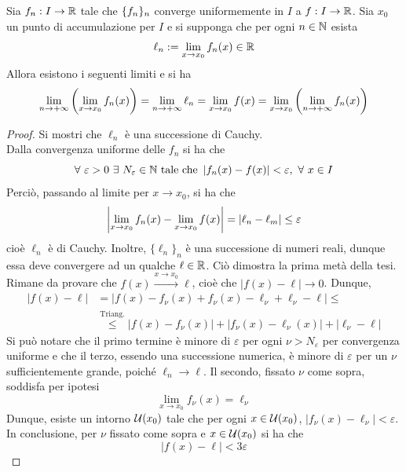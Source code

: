 \begin{theorem} \label{Teo: Scambio di limiti}
Sia $f_n: I \to \mathbb{R}$ tale che $\{f_n\}_n$ converge uniformemente in $I$ a $f: I \to \mathbb{R}$. Sia $x_0$ un punto di accumulazione per $I$ e si supponga che per ogni $n \in \mathbb{N}$ esista
\begin{equation}
    \ell_n:= \lim_{x \to x_0}{f_n(x)} \in \mathbb{R}
\end{equation}
Allora esistono i seguenti limiti e si ha
\begin{equation}
    \lim_{n \to +\infty}{\left(\lim_{x \to x_0} {f_n(x)}\right)}= \lim_{n \to +\infty}{\ell_n} = \lim_{x \to x_0} {f(x)} = \lim_{x \to x_0}{ \left( \lim_{n \to +\infty} {f_n(x)}\right)}
\end{equation}
\end{theorem}
\begin{proof}
    Si mostri che $\ell_n$ è una successione di Cauchy.\\
    Dalla convergenza uniforme delle $f_n$ si ha che
    \begin{equation}
        \forall\ \varepsilon>0\ \exists\ N_\varepsilon \in \N\ \text{tale che}\ \left| \fn(x)-f(x)\right|< \varepsilon,\ \forall\ x \in I
    \end{equation}
    Perciò, passando al limite per $x \to x_0$, si ha che
    \begin{equation}
        \left| \lim_{x \to x_0}{f_n(x)}-\lim_{x \to x_0}{f(x)}\right| = \left| \ell_n - \ell_m \right| \leq \varepsilon
    \end{equation}
    cioè $\ell_n$ è di Cauchy. Inoltre, $\{\ell_n\}_n$ è una successione di numeri reali, dunque essa deve convergere ad un qualche $\ell \in \mathbb{R}$. Ciò dimostra la prima metà della tesi.\\
    Rimane da provare che $f(x) \overset{x \to x_0}{\to} \ell$, cioè che $|f(x)-\ell| \to 0$. Dunque,
    \begin{equation}
    \begin{aligned}
        \left|f(x)-\ell\right| &= \left| f(x) - f_\nu(x)+ f_\nu(x)- \ell_\nu+ \ell_\nu- \ell\right| \leq\\
        &\overset{\text{Triang.}}{\leq} \left| f(x) - f_\nu(x) \right| +\left| f_\nu(x)- \ell_\nu(x)\right|+\left|\ell_\nu-\ell\right|
    \end{aligned}
    \end{equation}
    Si può notare che il primo termine è minore di $\varepsilon$ per ogni $\nu > N_\varepsilon$ per convergenza uniforme e che il terzo, essendo una successione numerica, è minore di $\varepsilon$ per un $\nu$ sufficientemente grande, poiché $\ell_n \to \ell$. Il secondo, fissato $\nu$ come sopra, soddisfa per ipotesi
    \begin{equation}
        \lim_{x \to x_0}{f_\nu(x)} = \ell_\nu
    \end{equation}
    Dunque, esiste un intorno $\mathcal{U}(x_0)$ tale che per ogni $x \in \mathcal{U}(x_0)$, $\left| f_\nu(x)- \ell_\nu \right| < \varepsilon$.\\
    In conclusione, per $\nu$ fissato come sopra e $x \in \mathcal{U}(x_0)$ si ha che
    \begin{equation}
        \left|f(x)-\ell\right| < 3 \varepsilon
    \end{equation}
\end{proof}
